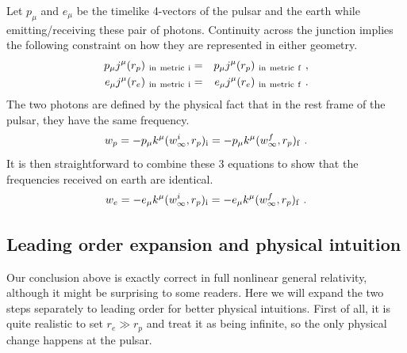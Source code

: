 \documentclass[aps,showpacs,onecolumn,floats,prd,superscriptaddress,nofootinbib]{revtex4}
\begin{document}
Let $p_\mu$ and $e_\mu$ be the timelike 4-vectors of the pulsar and the earth while emitting/receiving these pair of photons. Continuity across the junction implies the following constraint on how they are represented in either geometry.
\begin{eqnarray}
p_\mu j^\mu(r_p)_{\rm \ in \ metric \ i} &=& 
p_\mu j^\mu(r_p)_{\rm \ in \ metric \ f}~,
\label{eq-JuncPuls} \\ 
e_\mu j^\mu(r_e)_{\rm \ in \ metric \ i} &=& 
e_\mu j^\mu(r_e)_{\rm \ in \ metric \ f}~.
\end{eqnarray}
The two photons are defined by the physical fact that in the rest frame of the pulsar, they have the same frequency.
\begin{equation}
w_p = -p_\mu k^\mu(w^i_\infty, r_p)_{\rm i} = 
-p_\mu k^\mu(w^f_\infty, r_p)_{\rm f}~.
\label{eq-PulsEmit}
\end{equation}
It is then straightforward to combine these 3 equations to show that the frequencies received on earth are identical.
\begin{equation}
w_e = -e_\mu k^\mu(w^i_\infty, r_p)_{\rm i} = 
-e_\mu k^\mu(w^f_\infty, r_p)_{\rm f}~.
\end{equation}

\subsection{Leading order expansion and physical intuition}

Our conclusion above is exactly correct in full nonlinear general relativity, although it might be surprising to some readers. Here we will expand the two steps separately to leading order for better physical intuitions. First of all, it is quite realistic to set $r_e \gg r_p$ and treat it as being infinite, so the only physical change happens at the pulsar.
\end{document}
